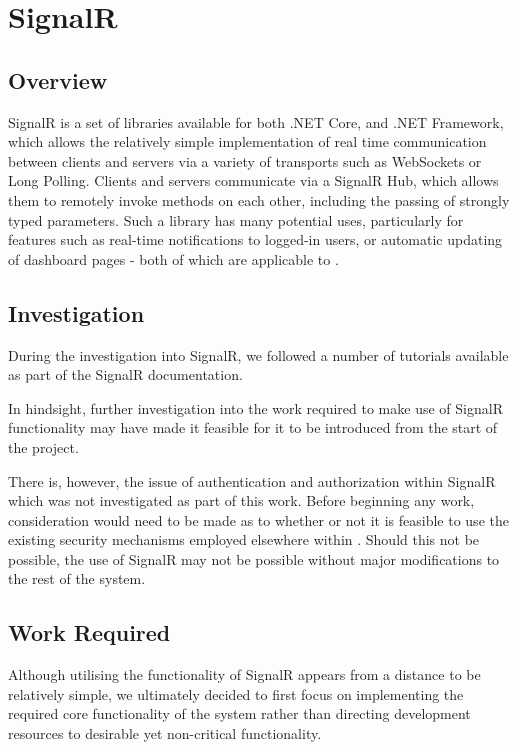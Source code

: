 \section{SignalR}

\subsection{Overview}

SignalR is a set of libraries available for both .NET Core, and .NET Framework, which allows the relatively simple implementation of real time communication between clients and servers via a variety of transports such as WebSockets or Long Polling\cite{SignalR}. Clients and servers communicate via a SignalR Hub, which allows them to remotely invoke methods on each other, including the passing of strongly typed parameters. Such a library has many potential uses, particularly for features such as real-time notifications to logged-in users, or automatic updating of dashboard pages - both of which are applicable to .

\subsection{Investigation}

During the investigation into SignalR, we followed a number of tutorials available as part of the SignalR documentation.

In hindsight, further investigation into the work required to make use of SignalR functionality may have made it feasible for it to be introduced from the start of the project.

There is, however, the issue of authentication and authorization within SignalR which was not investigated as part of this work. Before beginning any work, consideration would need to be made as to whether or not it is feasible to use the existing security mechanisms employed elsewhere within . Should this not be possible, the use of SignalR may not be possible without major modifications to the rest of the system.

\subsection{Work Required}

Although utilising the functionality of SignalR appears from a distance to be relatively simple, we ultimately decided to first focus on implementing the required core functionality of the system rather than directing development resources to desirable yet non-critical functionality.

